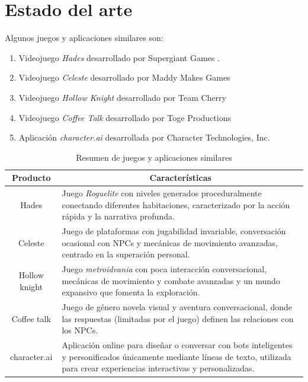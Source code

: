 \documentclass[12pt,twoside]{article}
\begin{document}
	\section{Estado del arte}
	Algunos juegos y aplicaciones similares son:
	\begin{enumerate}[noitemsep]
		\item Videojuego \textit{Hades} desarrollado por Supergiant Games \cite{game: hades}. 

		\item Videojuego \textit{Celeste} desarrollado por Maddy Makes Games \cite{game: celeste}

		\item Videojuego \textit{Hollow Knight} desarrollado por Team Cherry \cite{game: hollow}
		
		\item Videojuego \textit{Coffee Talk} desarrollado por Toge Productions \cite{game: coffee}
		
		\item Aplicación \textit{character.ai} desarrollada por Character Technologies, Inc. \cite{app: character}
	\end{enumerate}
	
	\begin{table}[H]
		\centering
		\begin{tabular}{|c|p{9cm}|}
			\hline
			\textbf{Producto} & \multicolumn{1}{c|}{\textbf{Características}} \\ \hline
			 Hades &  Juego \textit{Roguelite} con niveles generados proceduralmente conectando diferentes habitaciones, caracterizado por la acción rápida y la narrativa profunda.\\ \hline
			 
			 Celeste &  Juego de plataformas con jugabilidad invariable, conversación ocasional con NPCs y mecánicas de movimiento avanzadas, centrado en la superación personal. \\ \hline
			 
			 Hollow knight &   Juego \textit{metroidvania} con poca interacción conversacional, mecánicas de movimiento y combate avanzadas y un mundo expansivo que fomenta la exploración. \\ \hline
			 
			 Coffee talk &   Juego de género novela visual y aventura conversacional, donde las respuestas (limitadas por el juego) definen las relaciones con los NPCs.  \\ \hline
			 
			 character.ai&  Aplicación online para diseñar o conversar con bots inteligentes y personificados únicamente mediante líneas de texto, utilizada para crear experiencias interactivas y personalizadas.  \\ \hline
		\end{tabular}
		\caption{Resumen de juegos y aplicaciones similares}
		\label{table: aplicaciones}
	\end{table} 
	
\end{document}
